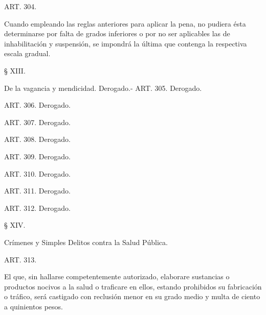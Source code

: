     ART. 304.

    Cuando empleando las reglas anteriores para aplicar la pena, no pudiera ésta determinarse por falta de grados inferiores o por no ser aplicables las de inhabilitación y suspensión, se impondrá la última que contenga la respectiva escala gradual.

    § XIII.

    De la vagancia y mendicidad. Derogado.-
    ART. 305. Derogado.






    ART. 306. Derogado.






    ART. 307. Derogado.






    ART. 308. Derogado.






    ART. 309. Derogado.






    ART. 310. Derogado.






    ART. 311. Derogado.






    ART. 312. Derogado.






    § XIV.

    Crímenes y Simples Delitos contra la Salud Pública.


    ART. 313.

    El que, sin hallarse competentemente autorizado, elaborare sustancias o productos nocivos a la salud o traficare en ellos, estando prohibidos su fabricación o tráfico, será castigado con reclusión menor en su grado medio y multa de ciento a quinientos pesos.


